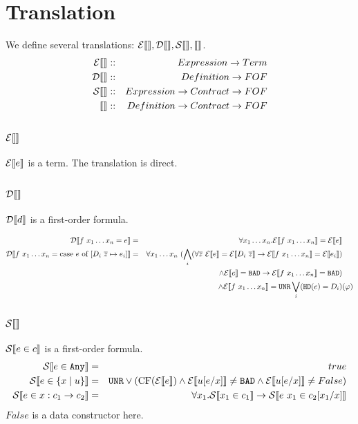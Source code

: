 \documentclass{article}
\begin{document}
\section{Translation}
We define several translations: $\etrans{},\dtrans{},\strans{},\trans{}$.
\begin{eqnarray*}
  \etrans{} &::& Expression \to Term\\
  \dtrans{} &::& Definition \to FOF\\
  \strans{} &::& Expression \to Contract \to FOF\\
  \trans {} &::& Definition \to Contract \to FOF\\
\end{eqnarray*}

\subsection{$\etrans{}$}
$\etrans{e}$ is a term. The translation is direct.

\subsection{$\dtrans{}$}
$\dtrans{d}$ is a first-order formula.

\begin{eqnarray*}
\dtrans{f~x_1 \dots x_n = e} &=& \forall x_1 \dots x_n.\etrans{f~x_1 \dots x_n} = \etrans{e} &\\
\dtrans{f~x_1 \dots x_n = \mbox{case } e \mbox{ of } [D_i~\overline{z} \mapsto e_i]} &=& \forall x_1 \dots x_n~(\bigwedge_i (\forall \overline{z}~\etrans{e} = \etrans{D_i~\overline{z}} \to \etrans{f~x_1 \dots x_n} = \etrans{e_i}) &\\
&& \land \etrans{e} = \bad \to \etrans{f~x_1 \dots x_n} = \bad)&\\ 
&& \land \etrans{f~x_1 \dots x_n} = \unr \bigvee_i (\texttt{HD}(e) = D_i) & (\varphi)\\
\end{eqnarray*}

\subsection{$\strans{}$}
$\strans{e \in c}$ is a first-order formula.
\begin{eqnarray}
\strans{e \in \any} &=& true\\
\strans{e \in \{x \mid u \}} &=& \unr \lor (\mbox{CF}(\etrans{e}) \land \etrans{u[e/x]} \neq \bad \land \etrans{u[e/x]} \neq False)\\
\strans{e \in x:c_1 \to c_2}  &=& \forall x_1. \strans{x_1 \in c_1} \to \strans{e~x_1 \in c_2[x_1/x]}\\
\end{eqnarray}
$False$ is a data constructor here.
\end{document}
